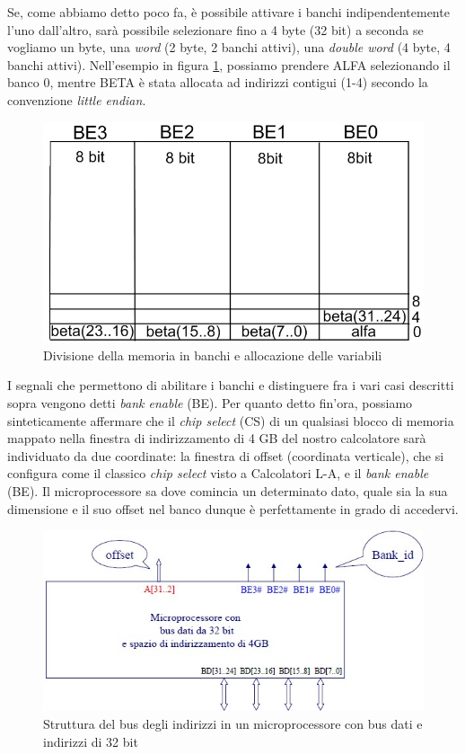 Se, come abbiamo detto poco fa, è possibile attivare i banchi indipendentemente l'uno dall'altro, sarà possibile selezionare fino a 4 byte (32 bit) a seconda se vogliamo un byte, una \textit{word} (2 byte, 2 banchi attivi), una\textit{ double word} (4 byte, 4 banchi attivi). Nell'esempio in figura \ref{fig:alfaBetaBanchi}, possiamo prendere ALFA selezionando il banco 0, mentre BETA è stata allocata ad indirizzi contigui (1-4) secondo la convenzione \textit{little endian}.

\begin{figure}[!h]
\centering
\includegraphics[width=0.65\columnwidth]{img/alfaBetaBanchi}
\caption{Divisione della memoria in banchi e allocazione delle variabili}
\label{fig:alfaBetaBanchi}
\end{figure}

I segnali che permettono di abilitare i banchi e distinguere fra i vari casi descritti sopra vengono detti \textit{bank enable} (BE). Per quanto detto fin'ora, possiamo sinteticamente affermare che il \textit{chip select} (CS) di un qualsiasi blocco di memoria mappato nella finestra di indirizzamento di 4 GB del nostro calcolatore sarà individuato da due coordinate: la finestra di offset (coordinata verticale), che si configura come il classico \textit{chip select} visto a Calcolatori L-A, e il \textit{bank enable} (BE). Il microprocessore sa dove comincia un determinato dato, quale sia la sua dimensione e il suo offset nel banco dunque è perfettamente in grado di accedervi.

\begin{figure}[!h]
\centering
\includegraphics[width=0.75\columnwidth]{img/microMultiByte}
\caption{Struttura del bus degli indirizzi in un microprocessore con
bus dati e indirizzi di 32 bit}
\label{fig:microMultiByte}
\end{figure}

